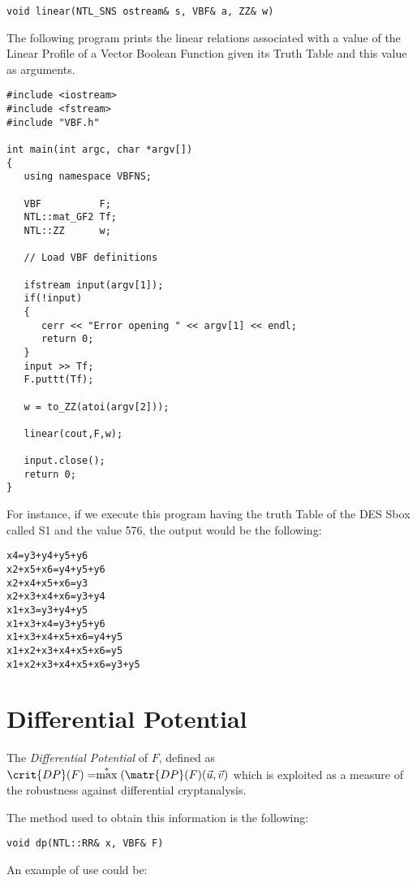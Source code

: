 \begin{verbatim}
void linear(NTL_SNS ostream& s, VBF& a, ZZ& w)
\end{verbatim}

The following program prints the linear relations associated with a value of the Linear Profile of a Vector Boolean Function given its Truth Table and this value as arguments.

\begin{verbatim}
#include <iostream>
#include <fstream>
#include "VBF.h"

int main(int argc, char *argv[])
{
   using namespace VBFNS;

   VBF          F;
   NTL::mat_GF2 Tf;
   NTL::ZZ      w;

   // Load VBF definitions

   ifstream input(argv[1]);
   if(!input)
   {
      cerr << "Error opening " << argv[1] << endl;
      return 0;
   }
   input >> Tf;
   F.puttt(Tf);

   w = to_ZZ(atoi(argv[2]));

   linear(cout,F,w);

   input.close();
   return 0;
}
\end{verbatim}

For instance, if we execute this program having the truth Table of the DES Sbox called S1 and the value 576, the output would be the following:

\begin{verbatim}
x4=y3+y4+y5+y6
x2+x5+x6=y4+y5+y6
x2+x4+x5+x6=y3
x2+x3+x4+x6=y3+y4
x1+x3=y3+y4+y5
x1+x3+x4=y3+y5+y6
x1+x3+x4+x5+x6=y4+y5
x1+x2+x3+x4+x5+x6=y5
x1+x2+x3+x4+x5+x6=y3+y5
\end{verbatim}

\section{Differential Potential}

The \textsl{Differential Potential} of $F$, defined as $\crit{DP}(F) =
  \stackrel{*}{\max}({\matr{DP}(F)(\vec{u},\vec{v})}$ which is exploited as a
  measure of the robustness against differential cryptanalysis. 

The method used to obtain this information is the following:

\begin{verbatim}
void dp(NTL::RR& x, VBF& F)
\end{verbatim}

An example of use could be:

